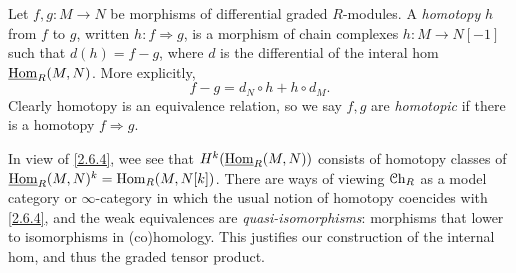 \begin{definition}\label{2.6.4}
	Let $f,g : M \to N$ be morphisms of differential graded $R$-modules. A \emph{homotopy} $h$ from $f$ to $g$, written $h: f \Rightarrow g$, is a morphism of chain complexes $h : M \to N[-1]$ such that $d(h)=f-g$, where $d$ is the differential of the interal hom $\underline{\operatorname{Hom}}_{R}(M, N) $. More explicitly,
	\[
		f-g = d_N \circ h + h \circ d_M
	.\]
	Clearly homotopy is an equivalence relation, so we say $f,g$ are \emph{homotopic} if there is a homotopy $f\Rightarrow g$.
\end{definition}
\begin{remark}\label{2.6.5}
	In view of \cref{2.6.4}, wee see that $H^k(\underline{\operatorname{Hom}}_{R}(M, N))$ consists of homotopy classes of $\underline{\operatorname{Hom}}_{R}(M, N) ^k = \operatorname{Hom}_{R}(M, N[k]) $. There are ways of viewing $\mathcal{C}\mathrm{h}_{R} $ as a model category or $\infty $-category in which the usual notion of homotopy coencides with \cref{2.6.4}, and the weak equivalences are \emph{quasi-isomorphisms}: morphisms that lower to isomorphisms in (co)homology. This justifies our construction of the internal hom, and thus the graded tensor product.
\end{remark}

